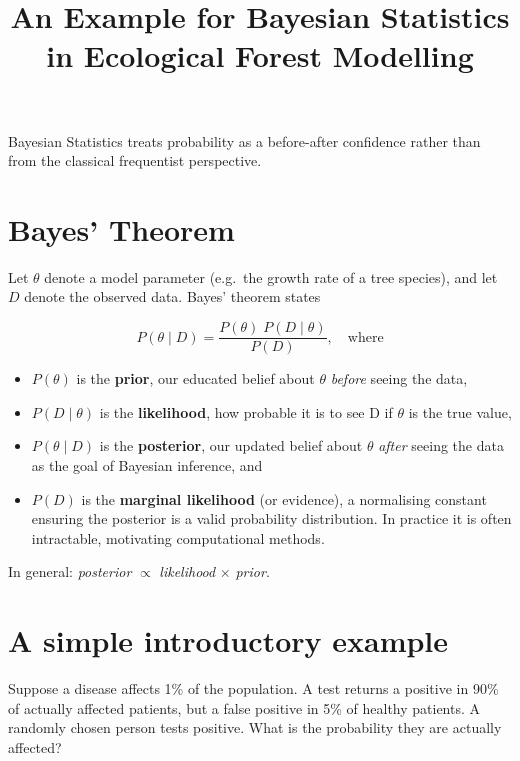 \documentclass[12pt, a4paper]{article}
\title{\textbf{An Example for Bayesian Statistics}\\
\large in Ecological Forest Modelling}
\author{}
\date{}
\begin{document}
\maketitle

\vspace{-14mm}
Bayesian Statistics treats probability as a before-after confidence rather
than from the classical frequentist perspective.

\section{Bayes' Theorem}

Let $\theta$ denote a model parameter (e.g.\ the growth rate of a tree
species), and let $D$ denote the observed data. Bayes' theorem states

\begin{equation} \label{eq:bayes_prop}
    P(\theta \mid D) = \frac{P(\theta) \; P(D \mid \theta)}{P(D)}, \quad \text{where}
\end{equation}

\begin{itemize}
    \item $P(\theta)$ is the \textbf{prior}, our educated belief about $\theta$
          \textit{before} seeing the data,

    \item $P(D \mid \theta)$ is the \textbf{likelihood}, how probable
          it is to see D if $\theta$ is the true value,

    \item $P(\theta \mid D)$ is the \textbf{posterior}, our updated
          belief about $\theta$ \textit{after} seeing the data as
          the goal of Bayesian inference, and

    \item $P(D)$ is the \textbf{marginal likelihood} (or evidence),
          a normalising constant ensuring the posterior is a valid
          probability distribution. In practice it is often intractable,
          motivating computational methods.
\end{itemize}

In general: \textit{posterior} $\propto$ \textit{likelihood} $\times$
\textit{prior}.

\section{A simple introductory example}

Suppose a disease affects 1\% of the population. A test
returns a positive in 90\% of actually affected patients, but
a false positive in 5\% of healthy patients. A randomly chosen person
tests positive. What is the probability they are actually affected?
\end{document}

